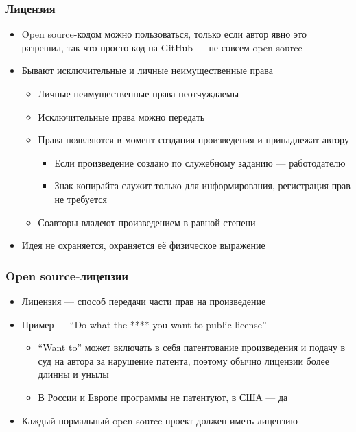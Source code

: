 \documentclass{../../slides-style}
\begin{document}
    \begin{frame}
        \frametitle{Лицензия}
        \begin{itemize}
            \item Open source-кодом можно пользоваться, только если автор явно это разрешил, так что просто код на GitHub --- не совсем open source
            \item Бывают исключительные и личные неимущественные права
            \begin{itemize}
                \item Личные неимущественные права неотчуждаемы
                \item Исключительные права можно передать
                \item Права появляются в момент создания произведения и принадлежат автору
                \begin{itemize}
                    \item Если произведение создано по служебному заданию --- работодателю
                    \item Знак копирайта служит только для информирования, регистрация прав не требуется
                \end{itemize}
                \item Соавторы владеют произведением в равной степени
            \end{itemize}
            \item Идея не охраняется, охраняется её физическое выражение
        \end{itemize}
    \end{frame}

    \begin{frame}
        \frametitle{Open source-лицензии}
        \begin{itemize}
            \item Лицензия --- способ передачи части прав на произведение
            \item Пример --- ``Do what the **** you want to public license''
            \begin{itemize}
                \item ``Want to'' может включать в себя патентование произведения и подачу в суд на автора за нарушение патента, поэтому обычно лицензии более длинны и унылы
                \item В России и Европе программы не патентуют, в США --- да
            \end{itemize}
            \item Каждый нормальный open source-проект должен иметь лицензию
        \end{itemize}
    \end{frame}
\end{document}

